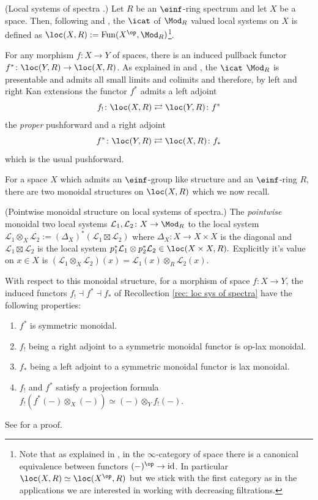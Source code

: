 \documentclass[10pt,reqno]{amsart}
\numberwithin{equation}{section}
\newcommand{\cL}{{\mathcal{L}}}
\newcommand{\id}{\mathrm{id}}
\begin{document}
\begin{recollection}(Local systems of spectra .)\label{rec: loc sys of spectra}
Let $R$ be an $\einf$-ring spectrum and let $X$ be a space. Then, following \cite[\S~3]{AndoBlumbergGepner2018ParametrizedThom} and \cite{Lurie2014Lecture21ATheory}, the $\icat$ of $\Mod_R$ valued local systems on $X$ is defined as $\loc(X,R):=\mathrm{Fun}(X^\op,\Mod_R)$\footnote{Note that as explained in \cite[Remark 3.2]{AndoBlumbergGepner2018ParametrizedThom}, in the $\infty$-category of space there is a canonical equivalence between functors $(-)^\op\to \id$. In particular $\loc(X,R)\simeq \loc(X^\op,R)$ but we stick with the first category as in the applications we are interested in working with decreasing filtrations.}.

For any morphism $f\colon X\to Y$ of spaces, there is an induced pullback functor $f^*\colon \loc(Y,R)\to \loc(X,R)$. As explained in \cite[\S~5.4]{AndoBlumbergGepner2018ParametrizedThom} and \cite[Remark 5]{Lurie2014Lecture21ATheory}, the $\icat$ $\Mod_R$ is presentable and admits all small limits and colimits and therefore, by left and right Kan extensions the functor $f^*$ admits a left adjoint $$f_!\colon \loc(X,R)\rightleftarrows \loc(Y,R)\colon f^*$$ the \emph{proper} pushforward and a right adjoint $$f^*\colon \loc(Y,R)\rightleftarrows \loc(X,R)\colon f_*$$ which is the usual pushforward. 
\end{recollection}

For a space $X$ which admits an $\einf$-group like structure and an $\einf$-ring $R$, there are two monoidal structures on $\loc(X,R)$ which we now recall. 

\begin{recollection}(Pointwise monoidal structure on local systems of spectra.)\label{pointwise monoidal}
 The \emph{pointwise} monoidal two local systems $\cL_1,\cL_2\colon X\to \Mod_R$ to the local system $\cL_1\otimes_X \cL_2:=(\Delta_X)^*(\cL_1\boxtimes \cL_2)$ where $\Delta_X\colon X\to X\times X$ is the diagonal and $\cL_1\boxtimes \cL_2$ is the local system $p_1^*\cL_1\otimes p_2^*\cL_2\in \loc(X\times X,R).$ Explicitly it's value on $x\in X$ is $(\cL_1\otimes_X \cL_2) (x)=\cL_1(x)\otimes_R \cL_2(x).$

With respect to this monoidal structure, for a morphism of space $f\colon X\to Y$, the induced functors $f_!\dashv f^* \dashv f_*$ of Recollection \ref{rec: loc sys of spectra} have the following properties:

\begin{enumerate}
    \item $f^*$ is symmetric monoidal. 
    \item $f_!$ being a right adjoint to a symmetric monoidal functor is op-lax monoidal.
    \item $f_*$ being a left adjoint to a symmetric monoidal functor is lax monoidal.
    \item $f_!$ and $f^*$ satisfy a projection formula  $f_!(f^*(-)\otimes_X(-))\simeq (-)\otimes_Y f_!(-).$
\end{enumerate}

See \cite[Proposition 6.8]{AndoBlumbergGepner2018ParametrizedThom} for a proof. 
\end{recollection}
\end{document}
